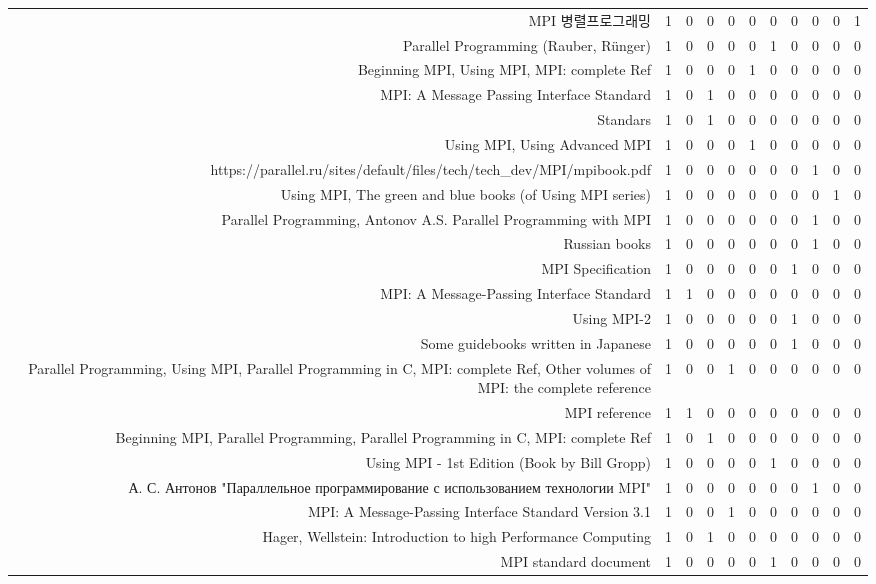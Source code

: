 {\begin{landscape}
\begin{longtable}[htb]{r|c|c|c|c|c|c|c|c|c|c}
{MPI 병렬프로그래밍} & 1 & 0 & 0 & 0 & 0 & 0 & 0 & 0 & 0 & 1 \\%
{Parallel Programming (Rauber, Rünger)} & 1 & 0 & 0 & 0 & 0 & 1 & 0 & 0 & 0 & 0 \\%
{Beginning MPI, Using MPI, MPI: complete Ref} & 1 & 0 & 0 & 0 & 1 & 0 & 0 & 0 & 0 & 0 \\%
{MPI: A Message Passing Interface Standard} & 1 & 0 & 1 & 0 & 0 & 0 & 0 & 0 & 0 & 0 \\%
{Standars} & 1 & 0 & 1 & 0 & 0 & 0 & 0 & 0 & 0 & 0 \\%
{Using MPI, Using Advanced MPI} & 1 & 0 & 0 & 0 & 1 & 0 & 0 & 0 & 0 & 0 \\%
{https://parallel.ru/sites/default/files/tech/tech\_dev/MPI/mpibook.pdf} & 1 & 0 & 0 & 0 & 0 & 0 & 0 & 1 & 0 & 0 \\%
{Using MPI, The green and blue books (of Using MPI series)} & 1 & 0 & 0 & 0 & 0 & 0 & 0 & 0 & 1 & 0 \\%
{Parallel Programming, Antonov A.S. Parallel Programming with MPI} & 1 & 0 & 0 & 0 & 0 & 0 & 0 & 1 & 0 & 0 \\%
{Russian books} & 1 & 0 & 0 & 0 & 0 & 0 & 0 & 1 & 0 & 0 \\%
{MPI Specification} & 1 & 0 & 0 & 0 & 0 & 0 & 1 & 0 & 0 & 0 \\%
{MPI: A Message-Passing Interface Standard} & 1 & 1 & 0 & 0 & 0 & 0 & 0 & 0 & 0 & 0 \\%
{Using MPI-2} & 1 & 0 & 0 & 0 & 0 & 0 & 1 & 0 & 0 & 0 \\%
{Some guidebooks written in Japanese} & 1 & 0 & 0 & 0 & 0 & 0 & 1 & 0 & 0 & 0 \\%
{Parallel Programming, Using MPI, Parallel Programming in C, MPI: complete Ref, Other volumes of MPI: the complete reference} & 1 & 0 & 0 & 1 & 0 & 0 & 0 & 0 & 0 & 0 \\%
{MPI reference} & 1 & 1 & 0 & 0 & 0 & 0 & 0 & 0 & 0 & 0 \\%
{Beginning MPI, Parallel Programming, Parallel Programming in C, MPI: complete Ref} & 1 & 0 & 1 & 0 & 0 & 0 & 0 & 0 & 0 & 0 \\%
{Using MPI - 1st Edition (Book by Bill Gropp)} & 1 & 0 & 0 & 0 & 0 & 1 & 0 & 0 & 0 & 0 \\%
{А. С. Антонов "Параллельное программирование с использованием технологии MPI"} & 1 & 0 & 0 & 0 & 0 & 0 & 0 & 1 & 0 & 0 \\%
{MPI: A Message-Passing Interface Standard Version 3.1} & 1 & 0 & 0 & 1 & 0 & 0 & 0 & 0 & 0 & 0 \\%
{Hager, Wellstein: Introduction to high Performance Computing} & 1 & 0 & 1 & 0 & 0 & 0 & 0 & 0 & 0 & 0 \\%
{MPI standard document} & 1 & 0 & 0 & 0 & 0 & 1 & 0 & 0 & 0 & 0 \\%
\hline%
\end{longtable}%
\end{landscape}}%
\clearpage%
